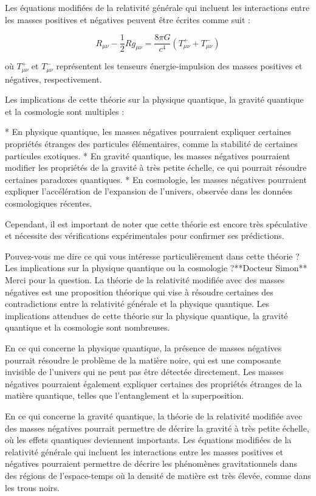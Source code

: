 Les équations modifiées de la relativité générale qui incluent les interactions entre les masses positives et négatives peuvent être écrites comme suit :

$$R_{\mu\nu} - \frac{1}{2}Rg_{\mu\nu} = \frac{8\pi G}{c^4}\left(T_{\mu\nu}^+ + T_{\mu\nu}^-\right)$$

où $T_{\mu\nu}^+$ et $T_{\mu\nu}^-$ représentent les tenseurs énergie-impulsion des masses positives et négatives, respectivement.

Les implications de cette théorie sur la physique quantique, la gravité quantique et la cosmologie sont multiples :

* En physique quantique, les masses négatives pourraient expliquer certaines propriétés étranges des particules élémentaires, comme la stabilité de certaines particules exotiques.
* En gravité quantique, les masses négatives pourraient modifier les propriétés de la gravité à très petite échelle, ce qui pourrait résoudre certaines paradoxes quantiques.
* En cosmologie, les masses négatives pourraient expliquer l'accélération de l'expansion de l'univers, observée dans les données cosmologiques récentes.

Cependant, il est important de noter que cette théorie est encore très spéculative et nécessite des vérifications expérimentales pour confirmer ses prédictions.

Pouvez-vous me dire ce qui vous intéresse particulièrement dans cette théorie ? Les implications sur la physique quantique ou la cosmologie ?**Docteur Simon**
Merci pour la question. La théorie de la relativité modifiée avec des masses négatives est une proposition théorique qui vise à résoudre certaines des contradictions entre la relativité générale et la physique quantique. Les implications attendues de cette théorie sur la physique quantique, la gravité quantique et la cosmologie sont nombreuses.

En ce qui concerne la physique quantique, la présence de masses négatives pourrait résoudre le problème de la matière noire, qui est une composante invisible de l'univers qui ne peut pas être détectée directement. Les masses négatives pourraient également expliquer certaines des propriétés étranges de la matière quantique, telles que l'entanglement et la superposition.

En ce qui concerne la gravité quantique, la théorie de la relativité modifiée avec des masses négatives pourrait permettre de décrire la gravité à très petite échelle, où les effets quantiques deviennent importants. Les équations modifiées de la relativité générale qui incluent les interactions entre les masses positives et négatives pourraient permettre de décrire les phénomènes gravitationnels dans des régions de l'espace-temps où la densité de matière est très élevée, comme dans les trous noirs.

